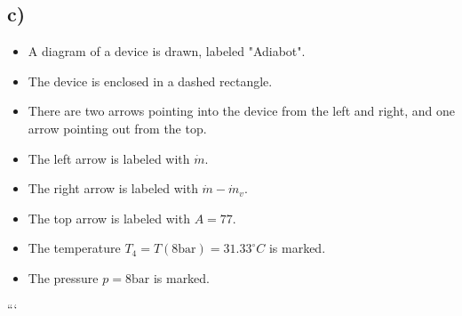 

\subsection*{c)}

\begin{itemize}
    \item A diagram of a device is drawn, labeled "Adiabot".
    \item The device is enclosed in a dashed rectangle.
    \item There are two arrows pointing into the device from the left and right, and one arrow pointing out from the top.
    \item The left arrow is labeled with \(\dot{m}\).
    \item The right arrow is labeled with \(\dot{m} - \dot{m}_v\).
    \item The top arrow is labeled with \(A = 77\).
    \item The temperature \(T_4 = T(8 \text{bar}) = 31.33^\circ C\) is marked.
    \item The pressure \(p = 8 \text{bar}\) is marked.
\end{itemize}

```